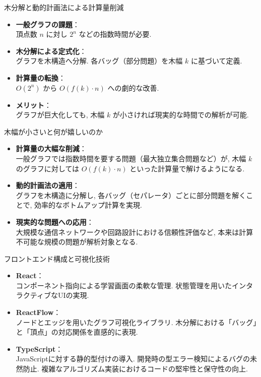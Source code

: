 \documentclass[aspectratio=169]{beamer}
\begin{document}
\begin{frame}{木分解と動的計画法による計算量削減}
\begin{itemize}
    \item \textbf{一般グラフの課題}：\\頂点数 $n$ に対し $2^n$ などの指数時間が必要.
    \item \textbf{木分解による定式化}：\\グラフを木構造へ分解. 各バッグ（部分問題）を木幅 $k$ に基づいて定義.
    \item \textbf{計算量の転換}：\\$O(2^n)$ から $O(f(k) \cdot n)$ への劇的な改善.
    \item \textbf{メリット}：\\ グラフが巨大化しても, 木幅 $k$ が小さければ現実的な時間での解析が可能.
\end{itemize}
\vspace{0.3cm}

\end{frame}

\begin{frame}{木幅が小さいと何が嬉しいのか}
\begin{itemize}
  \setlength{\parskip}{0.5em}
    \item \textbf{計算量の大幅な削減}：\\一般グラフでは指数時間を要する問題（最大独立集合問題など）が, 木幅 $k$ のグラフに対しては $O(f(k) \cdot n)$ といった計算量で解けるようになる.
    \item \textbf{動的計画法の適用}：\\グラフを木構造に分解し, 各バッグ（セパレータ）ごとに部分問題を解くことで, 効率的なボトムアップ計算を実現.
    \item \textbf{現実的な問題への応用}：\\ 大規模な通信ネットワークや回路設計における信頼性評価など, 本来は計算不可能な規模の問題が解析対象となる.
\end{itemize}
\vspace{0.5cm}
\end{frame}

\begin{frame}{フロントエンド構成と可視化技術}
\begin{itemize}
  \setlength{\parskip}{0.5em}
    \item \textbf{React}：\\ コンポーネント指向による学習画面の柔軟な管理. 状態管理を用いたインタラクティブなUIの実現.
    \item \textbf{ReactFlow}：\\ ノードとエッジを用いたグラフ可視化ライブラリ. 木分解における「バッグ」と「頂点」の対応関係を直感的に表現.
    \item \textbf{TypeScript}：\\ JavaScriptに対する静的型付けの導入. 開発時の型エラー検知によるバグの未然防止. 複雑なアルゴリズム実装におけるコードの堅牢性と保守性の向上.
\end{itemize}
\vspace{0.3cm}

\end{frame}
\end{document}
